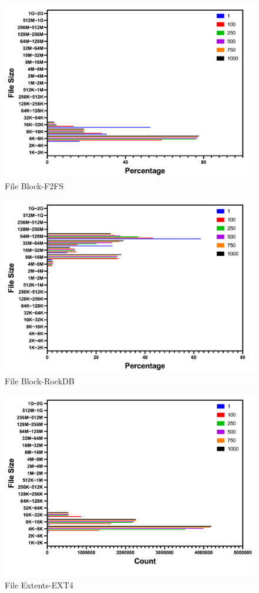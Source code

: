 \begin{figure}[t]
    \centering
	\includegraphics[width=0.95\columnwidth]{graphs/file_block_f2fs}
	\caption{File Block-F2FS}
	\label{f:file_block_f2fs}
\end{figure}

\begin{figure}[t]
    \centering
	\includegraphics[width=0.95\columnwidth]{graphs/file_block_rocksdb}
	\caption{File Block-RockDB}
	\label{f:file_block_rocksdb}
\end{figure}

\begin{figure}[t]
    \centering
	\includegraphics[width=0.95\columnwidth]{graphs/file_extents_ext4}
	\caption{File Extents-EXT4}
	\label{f:file_extents_ext4}
\end{figure}

